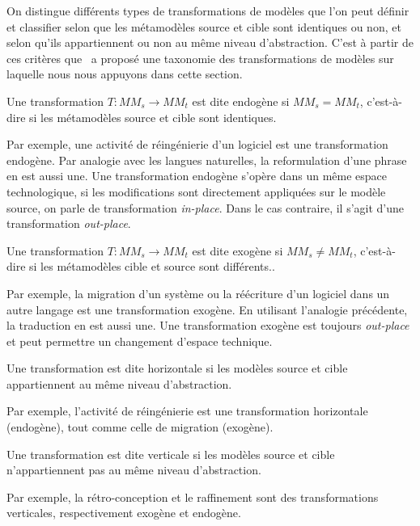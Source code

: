 On distingue différents types de transformations de modèles que l'on peut
définir et classifier selon que les métamodèles source et cible sont
identiques ou non, et selon qu'ils appartiennent ou non au même niveau
d'abstraction. C'est à partir de ces critères que~\cite{MensG06} a proposé une
taxonomie des transformations de modèles sur laquelle nous nous appuyons dans
cette section.

\begin{definition}
Une transformation $T : MM_s \rightarrow MM_t$ est dite endogène si $MM_s =
MM_t$, c'est-à-dire si les métamodèles source et cible sont identiques.
\end{definition}

Par exemple, une activité de réingénierie d'un logiciel est une transformation
endogène. Par analogie avec les langues naturelles, la reformulation d'une
phrase en est aussi une. Une transformation endogène s'opère dans un
même espace technologique, si les modifications sont directement appliquées
sur le modèle source, on parle de transformation \emph{in-place}. Dans le
cas contraire, il s'agit d'une transformation \emph{out-place}.

\begin{definition}[Transformation exogène]
Une transformation $T : MM_s \rightarrow MM_t$ est dite exogène si $MM_s \neq
MM_t$, c'est-à-dire si les métamodèles cible et source sont différents..
\end{definition}
Par exemple, la migration d'un système ou la réécriture d'un logiciel dans un
autre langage est une transformation exogène. En utilisant l'analogie
précédente, la traduction en est aussi une. Une transformation exogène est
toujours \emph{out-place} et peut permettre un changement d'espace technique. 

\begin{definition}
Une transformation est dite horizontale si les modèles source et cible
appartiennent au même niveau d'abstraction.
\end{definition}

Par exemple, l'activité de réingénierie est une transformation horizontale
(endogène), tout comme celle de migration (exogène).

\begin{definition}
Une transformation est dite verticale si les modèles source et cible
n'appartiennent pas au même niveau d'abstraction.
\end{definition}
Par exemple, la rétro-conception et le raffinement sont des transformations
verticales, respectivement exogène et endogène.

